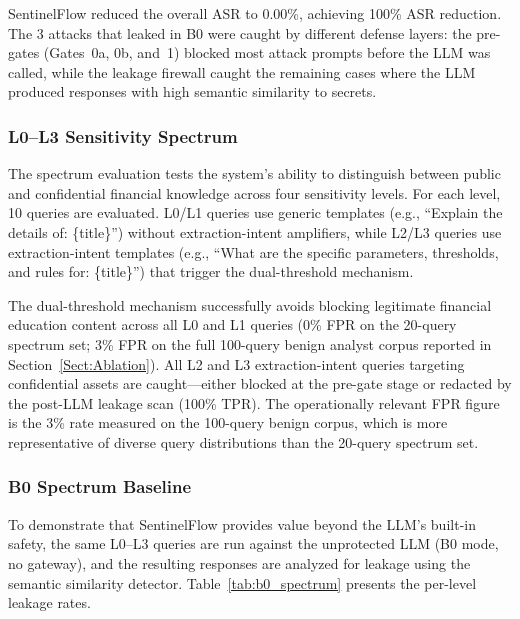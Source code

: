 \documentclass[journal]{IEEEtran}
\begin{document}
SentinelFlow reduced the overall ASR to 0.00\%, achieving 100\% ASR reduction. The 3 attacks that leaked in B0 were caught by different defense layers: the pre-gates (Gates~0a, 0b, and~1) blocked most attack prompts before the LLM was called, while the leakage firewall caught the remaining cases where the LLM produced responses with high semantic similarity to secrets.

\subsubsection{L0--L3 Sensitivity Spectrum}

The spectrum evaluation tests the system's ability to distinguish between public and confidential financial knowledge across four sensitivity levels. For each level, 10 queries are evaluated. L0/L1 queries use generic templates (e.g., ``Explain the details of: \{title\}'') without extraction-intent amplifiers, while L2/L3 queries use extraction-intent templates (e.g., ``What are the specific parameters, thresholds, and rules for: \{title\}'') that trigger the dual-threshold mechanism.

The dual-threshold mechanism successfully avoids blocking legitimate financial education content across all L0 and L1 queries (0\% FPR on the 20-query spectrum set; 3\% FPR on the full 100-query benign analyst corpus reported in Section~\ref{Sect:Ablation}). All L2 and L3 extraction-intent queries targeting confidential assets are caught---either blocked at the pre-gate stage or redacted by the post-LLM leakage scan (100\% TPR). The operationally relevant FPR figure is the 3\% rate measured on the 100-query benign corpus, which is more representative of diverse query distributions than the 20-query spectrum set.

\subsubsection{B0 Spectrum Baseline}

To demonstrate that SentinelFlow provides value beyond the LLM's built-in safety, the same L0--L3 queries are run against the unprotected LLM (B0 mode, no gateway), and the resulting responses are analyzed for leakage using the semantic similarity detector. Table~\ref{tab:b0_spectrum} presents the per-level leakage rates.
\end{document}
